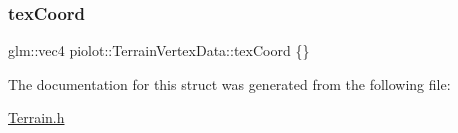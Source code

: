 \subsubsection{\texorpdfstring{tex\+Coord}{texCoord}}
{\footnotesize\ttfamily glm\+::vec4 piolot\+::\+Terrain\+Vertex\+Data\+::tex\+Coord \{\}}



The documentation for this struct was generated from the following file\+:\begin{DoxyCompactItemize}
\item 
\mbox{\hyperlink{_terrain_8h}{Terrain.\+h}}\end{DoxyCompactItemize}
